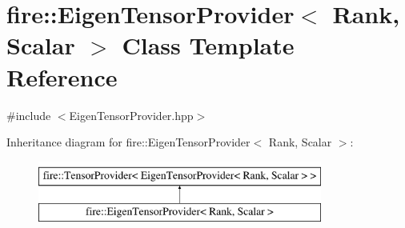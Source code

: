 \hypertarget{a00830}{}\section{fire\+:\+:Eigen\+Tensor\+Provider$<$ Rank, Scalar $>$ Class Template Reference}
\label{a00830}


{\ttfamily \#include $<$Eigen\+Tensor\+Provider.\+hpp$>$}

Inheritance diagram for fire\+:\+:Eigen\+Tensor\+Provider$<$ Rank, Scalar $>$\+:\begin{figure}[H]
\begin{center}
\leavevmode
\includegraphics[height=2.000000cm]{a00830}
\end{center}
\end{figure}
